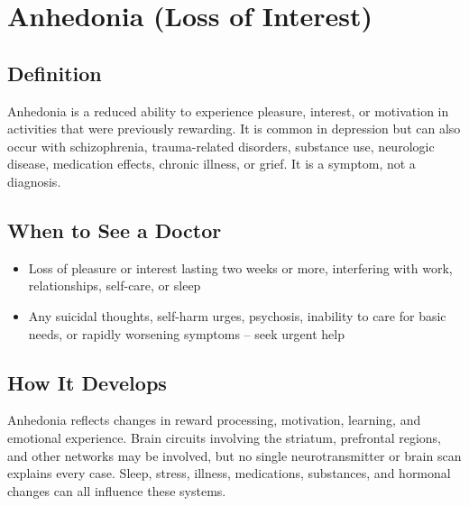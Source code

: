 \chapter{Anhedonia (Loss of Interest)}

\section*{Definition}
Anhedonia is a reduced ability to experience pleasure, interest, or motivation in activities that were previously rewarding. It is common in depression but can also occur with schizophrenia, trauma-related disorders, substance use, neurologic disease, medication effects, chronic illness, or grief. It is a symptom, not a diagnosis.

\section*{When to See a Doctor}

\begin{itemize}
 \item Loss of pleasure or interest lasting two weeks or more, interfering with work, relationships, self-care, or sleep
 \item Any suicidal thoughts, self-harm urges, psychosis, inability to care for basic needs, or rapidly worsening symptoms -- seek urgent help
\end{itemize}

\section*{How It Develops}
Anhedonia reflects changes in reward processing, motivation, learning, and emotional experience. Brain circuits involving the striatum, prefrontal regions, and other networks may be involved, but no single neurotransmitter or brain scan explains every case. Sleep, stress, illness, medications, substances, and hormonal changes can all influence these systems.

